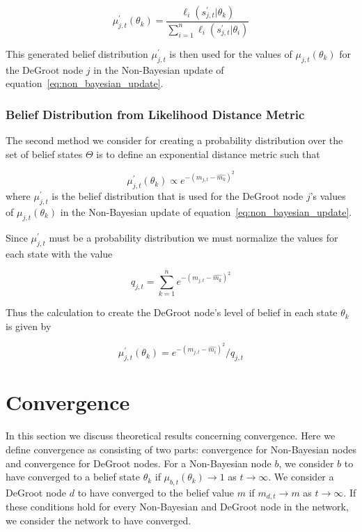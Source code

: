 \documentclass[a4paper,12pt]{article}
\begin{document}
\begin{equation}
\mu_{j,t}^\prime(\theta_k) = \frac{\ell_i(s_{j,t}^\prime|\theta_k)}{\sum_{i=1}^{n} \ell_i(s_{j,t}^\prime|\theta_i)}
\end{equation}

This generated belief distribution $\mu_{j,t}^\prime$ is then used for the values of $\mu_{j,t}(\theta_k)$ for the DeGroot node $j$ in the Non-Bayesian update of equation~\ref{eq:non_bayesian_update}.

\subsubsection{Belief Distribution from Likelihood Distance Metric}
\label{sec:likelihood_metric}

The second method we consider for creating a probability distribution over the set of belief states $\Theta$ is to define an exponential distance metric such that

\begin{equation}
\mu_{j,t}^\prime(\theta_k) \propto e^{-(m_{j,t}-\hat{m_k})^2}
\end{equation}
where $\mu_{j,t}^\prime$ is the belief distribution that is used for the DeGroot node $j$'s values of $\mu_{j,t}(\theta_k)$ in the Non-Bayesian update of equation~\ref{eq:non_bayesian_update}.

Since $\mu_{j,t}^\prime$ must be a probability distribution we must normalize the values for each state with the value

\begin{equation}
q_{j,t} = \sum_{k=1}^n e^{-(m_{j,t}-\hat{m_k})^2}
\end{equation}

Thus the calculation to create the DeGroot node's level of belief in each state $\theta_k$ is given by

\begin{equation}
\mu_{j,t}^\prime(\theta_k) = e^{-(m_{j,t}-\hat{m_i})^2} / q_{j,t}
\end{equation}


\section{Convergence}
In this section we discuss theoretical results concerning convergence.  Here we define convergence as consisting of two parts: convergence for Non-Bayesian nodes and convergence for DeGroot nodes.  For a Non-Bayesian node $b$, we consider $b$ to have converged to a belief state $\theta_{k}$ if $\mu_{b,t}(\theta_k) \to 1$ as $t \to \infty$.  We consider a DeGroot node $d$ to have converged to the belief value $m$ if $m_{d,t} \to m$ as $t \to \infty$.  If these conditions hold for every Non-Bayesian and DeGroot node in the network, we consider the network to have converged.
\end{document}
